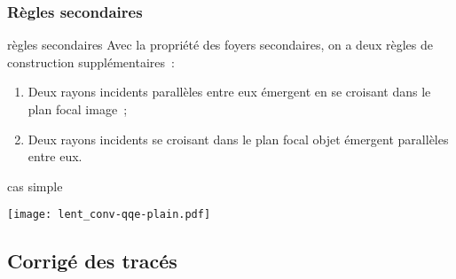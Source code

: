 \documentclass[../main/main.tex]{subfiles}
\begin{document}
\subsubsection{Règles secondaires}
\begin{tcbraster}[raster columns=2, raster equal height=rows]
    \begin{ror}[label=impo:lent_regles, hand]{règles secondaires}
        Avec la propriété des foyers secondaires, on a deux règles de
        construction supplémentaires~:
        \begin{enumerate}[start=4]

            \item Deux rayons incidents parallèles entre eux émergent en se
                croisant dans le plan focal image~;
            \item Deux rayons incidents se croisant dans le plan focal objet
                émergent parallèles entre eux.

        \end{enumerate}
    \end{ror}
    \begin{exem}[label=exem:constru]{cas simple}
        \begin{center}
            \texttt{[image: lent\_conv-qqe-plain.pdf]}
            \label{fig:convconstruqqe}
        \end{center}
    \end{exem}
\end{tcbraster}

\subsection{Corrigé des tracés}
\end{document}
